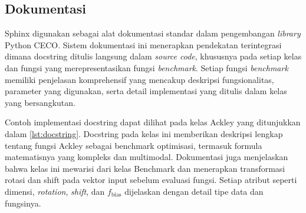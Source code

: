 \subsection{Dokumentasi}
Sphinx digunakan sebagai alat dokumentasi standar dalam pengembangan \textit{library} Python CECO. Sistem dokumentasi ini menerapkan pendekatan terintegrasi dimana docstring ditulis langsung dalam \textit{source code}, khususnya pada setiap kelas dan fungsi yang merepresentasikan fungsi \textit{benchmark}. Setiap fungsi \textit{benchmark} memiliki penjelasan komprehensif yang mencakup deskripsi fungsionalitas, parameter yang digunakan, serta detail implementasi yang ditulis dalam kelas yang bersangkutan.

Contoh implementasi docstring dapat dilihat pada kelas Ackley yang ditunjukkan dalam \cref{lst:docstring}. Docstring pada kelas ini memberikan deskripsi lengkap tentang fungsi Ackley sebagai benchmark optimisasi, termasuk formula matematisnya yang kompleks dan multimodal. Dokumentasi juga menjelaskan bahwa kelas ini mewarisi dari kelas Benchmark dan menerapkan transformasi rotasi dan shift pada vektor input sebelum evaluasi fungsi. Setiap atribut seperti dimensi, \textit{rotation}, \textit{shift}, dan $f_\text{bias}$ dijelaskan dengan detail tipe data dan fungsinya.

